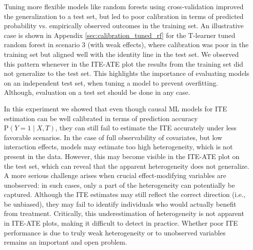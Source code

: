 Tuning more flexible models like random forests using cross-validation improved the generalization to a test set, but led to poor calibration in terms of predicted probability vs. empirically observed outcomes in the training set. An illustrative case is shown in Appendix \ref{sec:calibration_tuned_rf} for the T-learner tuned random forest in scenario 3 (with weak effects), where calibration was poor in the training set but aligned well with the identity line in the test set. We observed this pattern whenever in the ITE-ATE plot the results from the training set did not generalize to the test set. This highlights the importance of evaluating models on an independent test set, when tuning a model to prevent overfitting. Although, evaluation on a test set should be done in any case.

In this experiment we showed that even though causal ML models for ITE estimation can be well calibrated in terms of prediction accuracy $\text{P}(Y=1 \mid X, T)$, they can still fail to estimate the ITE accurately under less favorable scenarios. In the case of full observability of covariates, but low interaction effects, models may estimate too high heterogeneity, which is not present in the data. However, this may become visible in the ITE-ATE plot on the test set, which can reveal that the apparent heterogeneity does not generalize. A more serious challenge arises when crucial effect-modifying variables are unobserved: in such cases, only a part of the heterogeneity can potentially be captured. Although the ITE estimates may still reflect the correct direction (i.e., be unbiased), they may fail to identify individuals who would actually benefit from treatment. Critically, this underestimation of heterogeneity is not apparent in ITE-ATE plots, making it difficult to detect in practice. Whether poor ITE performance is due to truly weak heterogeneity or to unobserved variables remains an important and open problem. 




